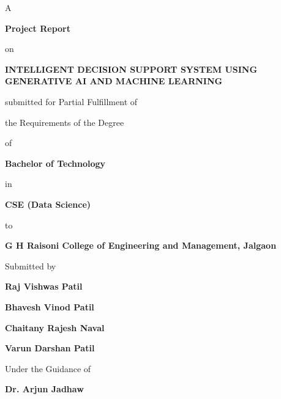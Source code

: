 
\begin{titlepage}
\centering
\linespread{1.15}\selectfont
{\fontsize{12}{14}\selectfont A\par}
{\fontsize{16}{19}\selectfont\bfseries Project Report\par}
{\fontsize{12}{14}\selectfont on\par}
\vspace{6pt}
{\fontsize{20}{24}\selectfont\bfseries INTELLIGENT DECISION SUPPORT SYSTEM USING GENERATIVE AI AND MACHINE LEARNING\par}
\vspace{12pt}
{\fontsize{12}{14}\selectfont submitted for Partial Fulfillment of\par}
{\fontsize{12}{14}\selectfont the Requirements of the Degree\par}
{\fontsize{12}{14}\selectfont of\par}
{\fontsize{16}{19}\selectfont\bfseries Bachelor of Technology\par}
{\fontsize{12}{14}\selectfont in\par}
{\fontsize{16}{19}\selectfont\bfseries CSE (Data Science)\par}
{\fontsize{12}{14}\selectfont to\par}
{\fontsize{16}{19}\selectfont\bfseries G H Raisoni College of Engineering and Management, Jalgaon\par}
\vspace{12pt}
{\fontsize{12}{14}\selectfont Submitted by\par}
\vspace{4pt}
{\fontsize{14}{17}\selectfont\bfseries Raj Vishwas Patil\par}
{\fontsize{14}{17}\selectfont\bfseries Bhavesh Vinod Patil\par}
{\fontsize{14}{17}\selectfont\bfseries Chaitany Rajesh Naval\par}
{\fontsize{14}{17}\selectfont\bfseries Varun Darshan Patil\par}
\vspace{12pt}
{\fontsize{12}{14}\selectfont Under the Guidance of\par}
\vspace{4pt}
{\fontsize{14}{17}\selectfont\bfseries Dr. Arjun Jadhaw\par}

\end{titlepage}
